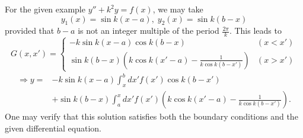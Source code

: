 For the given example $y'' + k^2 y = f(x)$, we may take
\[
	y_1(x) = \sin k(x - a),\; y_2(x) = \sin k(b - x)
\]
provided that $b - a$ is not an integer multiple of the period $\frac{2\pi}{k}$.
This leads to
\[
	G(x, x') =
	\begin{cases}
		-k\sin k(x - a) \cos k(b - x)                                              & (x < x') \\
		\sin k(b - x) \left( k\cos k(x' - a) - \frac{1}{k \cos k (b - x')} \right) & (x > x')
	\end{cases}
\]
\begin{align*}
	\Rightarrow y
	= & -k\sin k(x - a) \int_x^b dx' f(x') \cos k(b - x')                                                \\
	  & + \sin k(b - x) \int_a^x dx' f(x') \left( k\cos k(x' - a) - \frac{1}{k \cos k (b - x')} \right).
\end{align*}
One may verify that this solution satisfies both the boundary conditions and the given differential equation.